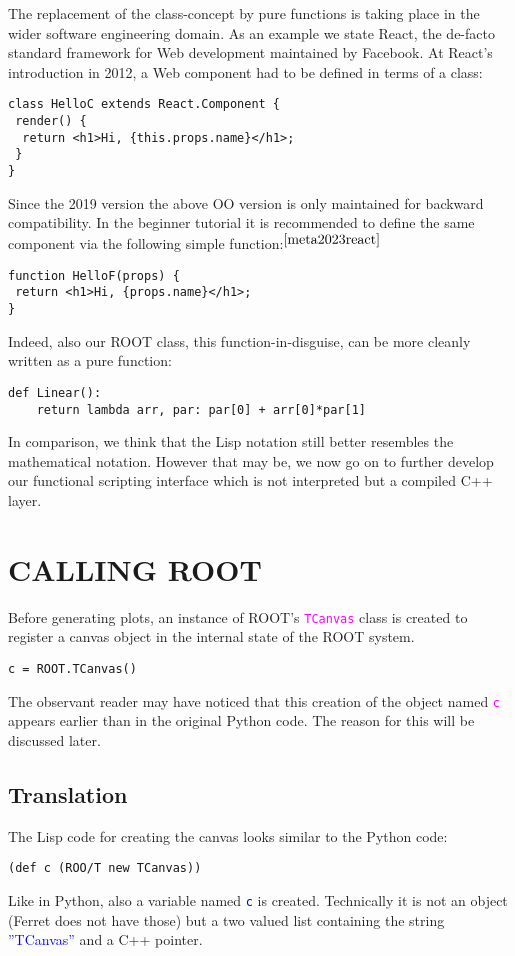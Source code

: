 \documentclass[twocolumn]{article}
\begin{document}
The replacement of the class-concept by pure functions is taking place in the wider software engineering domain. As an example we state React, the de-facto standard framework for Web development maintained by Facebook.
At React’s introduction in 2012, a Web component had to be defined in terms of a class:
{\color{magenta}\begin{verbatim}
class HelloC extends React.Component {
 render() {
  return <h1>Hi, {this.props.name}</h1>;
 }
}
\end{verbatim}}
Since the 2019 version the above OO version is only maintained for backward compatibility. In the beginner tutorial it is recommended to define the same component via the following simple function:$^{\cite{meta2023react}}$
{\color{magenta}\begin{verbatim}
function HelloF(props) {
 return <h1>Hi, {props.name}</h1>;
}
\end{verbatim}}
Indeed, also our ROOT class, this function-in-disguise, can be more cleanly written as a pure function:
{\color{magenta}\begin{verbatim}
def Linear():
    return lambda arr, par: par[0] + arr[0]*par[1]
\end{verbatim}}
In comparison, we think that the Lisp notation still better resembles the mathematical notation. However that may be, we now go on to further develop our functional scripting interface which is not interpreted but a compiled C++ layer.

\section{CALLING ROOT}
Before generating plots, an instance of ROOT’s \texttt{\textcolor{magenta}{TCanvas}}  class is created to register a canvas object in the internal state of the ROOT system.
{\color{magenta}\begin{verbatim}
c = ROOT.TCanvas()
\end{verbatim}}
The observant reader may have noticed that this creation of the object named \texttt{\textcolor{magenta}{c}} appears earlier than in the original Python code. The reason for this will be discussed later.

\subsection{Translation} 
The Lisp code for creating the canvas looks similar to the Python code:
{\color{blue}\begin{verbatim}
(def c (ROO/T new TCanvas))
\end{verbatim}}
Like in Python, also a variable named \texttt{\textcolor{blue}{c}} is created. Technically it is not an object (Ferret does not have those) but a two valued list containing the string \textcolor{blue}{”TCanvas”}  and a C++ pointer.
\end{document}
